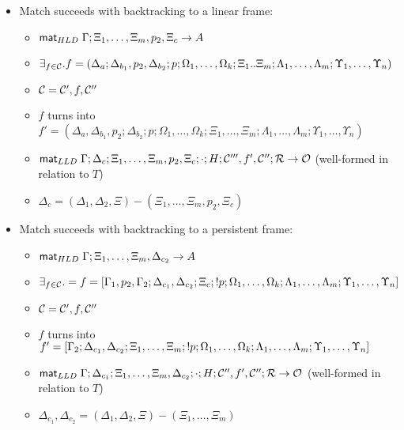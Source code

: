 \begin{lemma}
\begin{itemize}[leftmargin=*]
   \item Match succeeds with backtracking to a linear frame:
   \begin{itemize}[leftmargin=\secondm]
      \item $\mathsf{mat}_{HLD} \; \Gamma; \Xi_1, \dotsc, \Xi_m, p_2, \Xi_c \rightarrow A$
      \item $\exists_{f \in \mathcal{C}}. f = (\Delta_a; \Delta_{b_1}, p_2, \Delta_{b_2}; p;
            \Omega_1, \dotsc, \Omega_k; \Xi_1 .. \Xi_m; \Lambda_1, \dotsc,
            \Lambda_m; \Upsilon_1, \dotsc, \Upsilon_n)$

      \item $\mathcal{C} = \mathcal{C'}, f, \mathcal{C''}$

      \item $f$ turns into $f' = (\Delta_a, \Delta_{b_1}, p_2;
            \Delta_{b_2}; p; \Omega_1, \dotsc, \Omega_k; \Xi_1, \dotsc, \Xi_m;
            \Lambda_1, \dotsc, \Lambda_m; \Upsilon_1, \dotsc, \Upsilon_n)$

      \item $\mathsf{mat}_{LLD} \; \Gamma; \Delta_c; \Xi_1, \dotsc, \Xi_m, p_2, \Xi_c; \cdot; H;
            \mathcal{C'''}, f', \mathcal{C''}; \mathcal{R} \rightarrow \mathcal{O}$ (well-formed in
                  relation to $T$)
      \item $\Delta_c = (\Delta_1, \Delta_2, \Xi) - (\Xi_1, \dotsc, \Xi_m, p_2, \Xi_c)$
   \end{itemize}

   \item Match succeeds with backtracking to a persistent frame:
   \begin{itemize}[leftmargin=\secondm]
      \item $\mathsf{mat}_{HLD} \; \Gamma; \Xi_1, \dotsc, \Xi_m, \Delta_{c_2} \rightarrow A$
      \item $\exists_{f \in \mathcal{C}}. = f = [\Gamma_1, p_2, \Gamma_2; \Delta_{c_1}, \Delta_{c_2}; \Xi_c; {!}
         p; \Omega_1, \dotsc, \Omega_k; \Lambda_1, \dotsc, \Lambda_m;
         \Upsilon_1, \dotsc, \Upsilon_n]$
      \item $\mathcal{C} = \mathcal{C'}, f, \mathcal{C''}$
      \item $f$ turns into $f' = [\Gamma_2; \Delta_{c_1}, \Delta_{c_2}; \Xi_1, \dotsc,
         \Xi_m; {!} p; \Omega_1, \dotsc, \Omega_k; \Lambda_1, \dotsc,
         \Lambda_m; \Upsilon_1, \dotsc, \Upsilon_n]$
      \item $\mathsf{mat}_{LLD} \; \Gamma; \Delta_{c_1}; \Xi_1, \dotsc, \Xi_m, \Delta_{c_2};
         \cdot; H; \mathcal{C''}, f', \mathcal{C''}; \mathcal{R} \rightarrow \mathcal{O}$ (well-formed in
            relation to $T$)
      \item $\Delta_{c_1}, \Delta_{c_2} = (\Delta_1, \Delta_2,
            \Xi) - (\Xi_1, \dotsc, \Xi_m)$
   \end{itemize}
\end{itemize}
\end{lemma}

